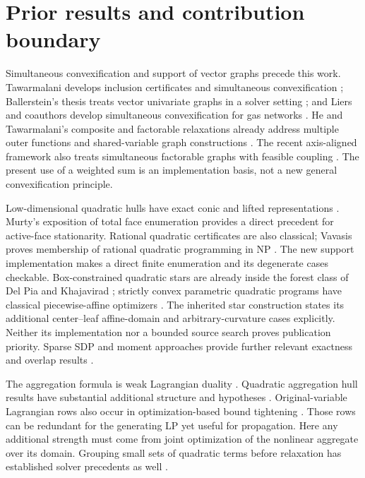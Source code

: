 \section{Prior results and contribution boundary}\label{sec:literature}

Simultaneous convexification and support of vector graphs precede this
work. Tawarmalani develops inclusion certificates and simultaneous
convexification \cite{Tawarmalani2010}; Ballerstein's thesis treats
vector univariate graphs in a solver setting \cite{Ballerstein2013};
and Liers and coauthors develop simultaneous convexification for gas
networks \cite{LiersEtAl2021}. He and Tawarmalani's composite and
factorable relaxations already address multiple outer functions and
shared-variable graph constructions
\cite{HeTawarmalani2021,HeTawarmalani2022,HeTawarmalani2024}.
The recent axis-aligned framework also treats simultaneous factorable
graphs with feasible coupling \cite{ZhuHeTawarmalani2026}.
The present use of a weighted sum is an implementation basis, not a
new general convexification principle.

Low-dimensional quadratic hulls have exact conic and lifted
representations \cite{AnstreicherBurer2010}. Murty's exposition of total
face enumeration \cite[Section 2.9]{Murty1997} provides a direct
precedent for active-face stationarity. Rational quadratic certificates
are also classical; Vavasis proves
membership of rational quadratic programming in NP \cite{Vavasis1990}.
The new support implementation makes a direct finite enumeration and its
degenerate cases checkable. Box-constrained quadratic stars are already
inside the forest class of Del Pia and Khajavirad
\cite{DelPiaKhajavirad2026}; strictly convex parametric quadratic
programs have classical piecewise-affine optimizers
\cite{BemporadEtAl2002}. The inherited star construction states its
additional center--leaf affine-domain and arbitrary-curvature cases
explicitly. Neither its implementation nor a bounded source search proves
publication priority. Sparse SDP and moment approaches provide further
relevant exactness and overlap results
\cite{Khajavirad2026,Lasserre2006}.

The aggregation formula is weak Lagrangian duality
\cite[Sections 5.1--5.2]{BoydVandenberghe2004}. Quadratic aggregation
hull results have substantial additional structure and hypotheses
\cite{DeyMunozSerrano2022,BlekhermanDeySun2024}. Original-variable
Lagrangian rows also occur in optimization-based bound tightening
\cite{GleixnerEtAl2017}. Those rows can be redundant for the generating
LP yet useful for propagation. Here any additional strength must come
from joint optimization of the nonlinear aggregate over its domain.
Grouping small sets of quadratic terms before relaxation has established
solver precedents as well \cite{MisenerFloudas2012}.

